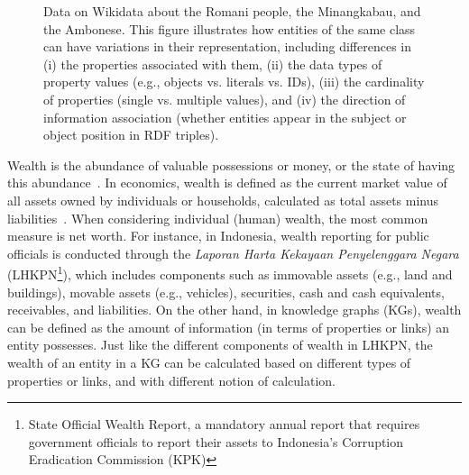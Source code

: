 




\begin{figure}[!htbp]
    \centering
    \caption{Data on Wikidata about the Romani people, the Minangkabau, and the Ambonese. This figure illustrates how entities of the same class can have variations in their representation, including differences in (i) the properties associated with them, (ii) the data types of property values (e.g., objects vs. literals vs. IDs), (iii) the cardinality of properties (single vs. multiple values), and (iv) the direction of information association (whether entities appear in the subject or object position in RDF triples).} \label{fig:intro-wikidata}
\end{figure}

Wealth is the abundance of valuable possessions or money, or the state of having this abundance~\cite{wealthOed}. In economics, wealth is defined as the current market value of all assets owned by individuals or households, calculated as total assets minus liabilities~\cite{SaezG16}. When considering individual (human) wealth, the most common measure is net worth. For instance, in Indonesia, wealth reporting for public officials is conducted through the \textit{Laporan Harta Kekayaan Penyelenggara Negara} (LHKPN\footnote{State Official Wealth Report, a mandatory annual report that requires government officials to report their assets to Indonesia's Corruption Eradication Commission (KPK)}), which includes components such as immovable assets (e.g., land and buildings), movable assets (e.g., vehicles), securities, cash and cash equivalents, receivables, and liabilities. On the other hand, in knowledge graphs (KGs), wealth can be defined as the amount of information (in terms of properties or links) an entity possesses. Just like the different components of wealth in LHKPN, the wealth of an entity in a KG can be calculated based on different types of properties or links, and with different notion of calculation.

